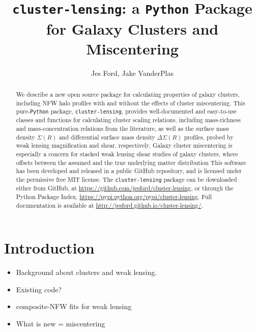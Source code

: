 \documentclass{emulateapj}
\begin{document}
\title{\MakeLowercase{\lstinline{cluster-lensing}}: a \lstinline{P}\MakeLowercase{\lstinline{ython}} Package for Galaxy Clusters and Miscentering}
\author{
Jes Ford,  
Jake VanderPlas
}



\begin{abstract}
We describe a new open source package for calculating properties of galaxy clusters, including NFW halo profiles with and without the effects of cluster miscentering. This pure-\lstinline{Python} package, \lstinline{cluster-lensing}, provides well-documented and easy-to-use classes and functions for calculating cluster scaling relations, including mass-richness and mass-concentration relations from the literature, as well as the surface mass density $\Sigma(R)$ and differential surface mass density $\Delta\Sigma(R)$ profiles, probed by weak lensing magnification and shear, respectively. Galaxy cluster miscentering is especially a concern for stacked weak lensing shear studies of galaxy clusters, where offsets between the assumed and the true underlying matter distribution
This software has been developed and released in a public GitHub repository, and is licensed under the permissive free MIT license. The \lstinline{cluster-lensing} package can be downloaded either from GitHub, at \url{https://github.com/jesford/cluster-lensing}, or through the Python Package Index, \url{https://pypi.python.org/pypi/cluster-lensing}. Full documentation is available at \url{http://jesford.github.io/cluster-lensing/}.
\end{abstract}


\setcounter{section}{0}
\setcounter{subsection}{0}
\setcounter{subsubsection}{0}

\section{Introduction}
\label{intro}

\begin{itemize} \itemsep -2pt
\item Background about clusters and weak lensing.
\item Existing code? 
\item composite-NFW fits for weak lensing \citep{Ford12, Ford14, Ford15}
\item What is new = miscentering \citep{Johnston07, George12, Ford14, Ford15}
\end{itemize}
\end{document}
